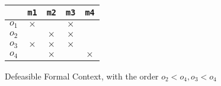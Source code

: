 \documentclass[11pt]{article}
\begin{document}
\begin{figure}[h]
  \begin{center}
    \begin{tabular}{r|cccc}
            & \texttt{m1} & \texttt{m2} & \texttt{m3} & \texttt{m4} \\ \hline
      $o_1$ & $\times$    &             & $\times$    &             \\
      $o_2$ &             & $\times$    & $\times$    &             \\
      $o_3$ & $\times$    & $\times$    & $\times$    &             \\
      $o_4$ &             & $\times$    &             & $\times$    \\
    \end{tabular}
  \end{center}
  \caption{Defeasible Formal Context, with the order $o_2 < o_4, o_3 < o_4$}
  \label{fig:defeasible-context-counter-example}
\end{figure}






\end{document}
